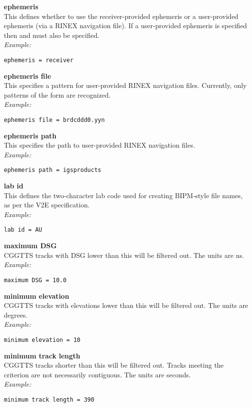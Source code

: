 {\bfseries ephemeris}\\
This defines whether to use the receiver-provided ephemeris or a user-provided ephemeris (via a RINEX navigation file).
If a user-provided ephemeris is specified then  and  
must also be specified.\\
\textit{Example:}
\begin{lstlisting}
ephemeris = receiver
\end{lstlisting}

{\bfseries ephemeris file}\\
This specifies a pattern for user-provided RINEX navigation files.
Currently, only patterns of the form  are recognized.\\
\textit{Example:}
\begin{lstlisting}
ephemeris file = brdcddd0.yyn
\end{lstlisting}

{\bfseries ephemeris path}\\
This specifies the path to user-provided RINEX navigation files.\\
\textit{Example:}
\begin{lstlisting}
ephemeris path = igsproducts
\end{lstlisting}

{\bfseries lab id}\\
This defines the two-character lab code used for creating BIPM-style file names, as per the V2E specification.\\
\textit{Example:}
\begin{lstlisting}
lab id = AU
\end{lstlisting}

{\bfseries maximum DSG}\\
CGGTTS tracks with DSG lower than this will be filtered out. 
The units are ns.\\
\textit{Example:}
\begin{lstlisting}
maximum DSG = 10.0
\end{lstlisting}

{\bfseries minimum elevation}\\
CGGTTS tracks with elevations lower than this will be filtered out. 
The units are degrees.\\
\textit{Example:}
\begin{lstlisting}
minimum elevation = 10
\end{lstlisting}

{\bfseries minimum track length}\\
CGGTTS tracks shorter than this will be filtered out. Tracks meeting the criterion are not necessarily contiguous.
The units are seconds.\\
\textit{Example:}
\begin{lstlisting}
minimum track length = 390
\end{lstlisting}

